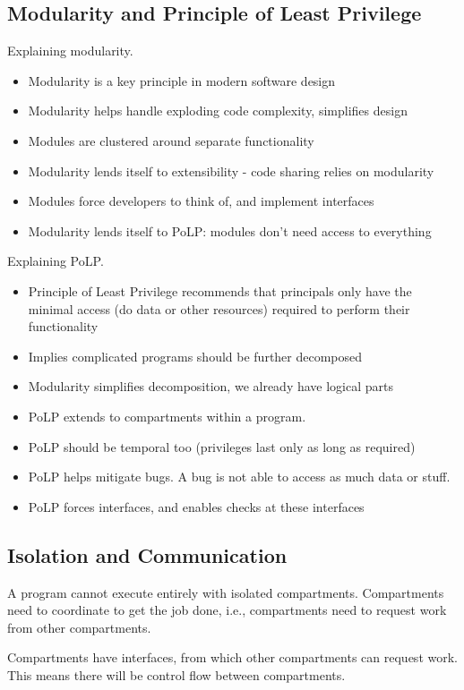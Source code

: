 \subsection{Modularity and Principle of Least Privilege}
Explaining modularity.
\begin{itemize}
  \item Modularity is a key principle in modern software design
  \item Modularity helps handle exploding code complexity, simplifies design
  \item Modules are clustered around separate functionality
  \item Modularity lends itself to extensibility - code sharing relies on modularity
  \item Modules force developers to think of, and implement interfaces
  \item Modularity lends itself to PoLP: modules don't need access to everything
\end{itemize}

Explaining PoLP.
\begin{itemize}
  \item Principle of Least Privilege recommends that principals only have
        the minimal access (do data or other resources) required to perform
        their functionality
  \item Implies complicated programs should be further decomposed
  \item Modularity simplifies decomposition, we already have logical parts
  \item PoLP extends to compartments within a program.
  \item PoLP should be temporal too (privileges last only as long as required)
  \item PoLP helps mitigate bugs. A bug is not able to access as much data or stuff.
  \item PoLP forces interfaces, and enables checks at these interfaces
\end{itemize}

\subsection{Isolation and Communication}

A program cannot execute entirely with isolated compartments.
Compartments need to coordinate to get the job done, i.e., compartments need
to request work from other compartments.

Compartments have interfaces, from which other compartments can request work.
This means there will be control flow between compartments.

